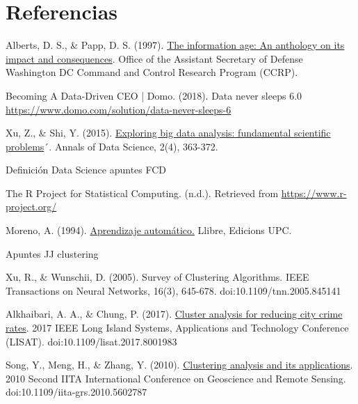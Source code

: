 \documentclass[10pt, a4paper]{article}
\begin{document}
\clearpage

\section{Referencias}
\renewcommand{\section}[2]{}
\begin{thebibliography}{X}

 Alberts, D. S., \& Papp, D. S. (1997). \href{http://www.dodccrp.org/files/Alberts_Anthology_I.pdf} {The information age: An anthology on its impact and consequences}. Office of the Assistant Secretary of Defense Washington DC Command and Control Research Program (CCRP).

 Becoming A Data-Driven CEO | Domo. (2018). Data never sleeps 6.0 \href{https://www.domo.com/solution/data-never-sleeps-6} {https://www.domo.com/solution/data-never-sleeps-6}

 Xu, Z., \& Shi, Y. (2015). \href {https://link.springer.com/content/pdf/10.1007/s40745-015-0063-7.pdf} {Exploring big data analysis: fundamental scientific problems}´. Annals of Data Science, 2(4), 363-372.

 Definición Data Science apuntes FCD

 The R Project for Statistical Computing. (n.d.). Retrieved from \href{https://www.r-project.org/} {https://www.r-project.org/}

 Moreno, A. (1994). \href{https://upcommons.upc.edu/bitstream/handle/2099.3/36157/9788483019962.pdf?sequence=1&isAllowed=y} {Aprendizaje automático.} Llibre, Edicions UPC.

 Apuntes JJ clustering

 Xu, R., \& Wunschii, D. (2005). Survey of Clustering Algorithms. IEEE Transactions on Neural Networks, 16(3), 645-678. doi:10.1109/tnn.2005.845141

 Alkhaibari, A. A., \& Chung, P. (2017). \href{https://ieeexplore.ieee.org/document/8001983} {Cluster analysis for reducing city crime rates}. 2017 IEEE Long Island Systems, Applications and Technology Conference (LISAT). doi:10.1109/lisat.2017.8001983

 Song, Y., Meng, H., \& Zhang, Y. (2010). \href{https://ieeexplore.ieee.org/document/5602787} {Clustering analysis and its applications}. 2010 Second IITA International Conference on Geoscience and Remote Sensing. doi:10.1109/iita-grs.2010.5602787


\end{thebibliography}
\end{document}
